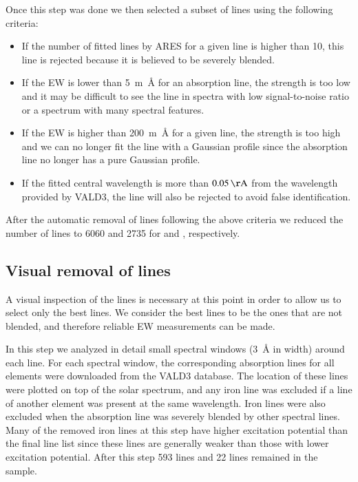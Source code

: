 \documentclass{aa}
\begin{document}
Once this step was done we then selected a subset of lines using the
following criteria:
\begin{itemize}
    \item If the number of fitted lines by ARES for a given line is higher than 10,
        this line is rejected because it is believed to be severely blended.
    \item If the EW is lower than \SI{5}{m\angstrom} for an absorption line, the strength
        is too low and it may be difficult to see the line in spectra with low
        signal-to-noise ratio or a spectrum with many spectral features.
    \item If the EW is higher than \SI{200}{m\angstrom} for a given line, the strength
        is too high and we can no longer fit the line with a Gaussian profile since
        the absorption line no longer has a pure Gaussian profile.
    \item If the fitted central wavelength is more than $\SI{0.05}{\AA}$
        from the wavelength provided by VALD3, the line will also be rejected to
        avoid false identification.
\end{itemize}
After the automatic removal of lines following the above criteria
we reduced the number of lines to 6060 and 2735 for  and
, respectively.



\subsection{Visual removal of lines}
\label{sub:visual_removal_of_lines}

A visual inspection of the lines is necessary at this point in order to
allow us to select only the best lines. We consider the best lines to be
the ones that are not blended, and therefore reliable EW measurements
can be made.

In this step we analyzed in detail small spectral windows
(\SI{3}{\angstrom} in width) around each line. For each spectral window,
the corresponding absorption lines for all elements were downloaded
from the VALD3 database. The location of these lines were plotted on
top of the solar spectrum, and any iron line was excluded if a line of
another element was present at the same wavelength. Iron lines were
also excluded when the absorption line was severely blended by other
spectral lines. Many of the removed iron lines at this step have higher
excitation potential than the final line list since these lines are
generally weaker than those with lower excitation potential. After this
step 593  lines and 22  lines remained in the
sample.
\end{document}
